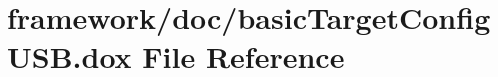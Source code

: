 \hypertarget{basic_target_config_u_s_b_8dox}{}\section{framework/doc/basic\+Target\+Config\+U\+SB.dox File Reference}
\label{basic_target_config_u_s_b_8dox}
